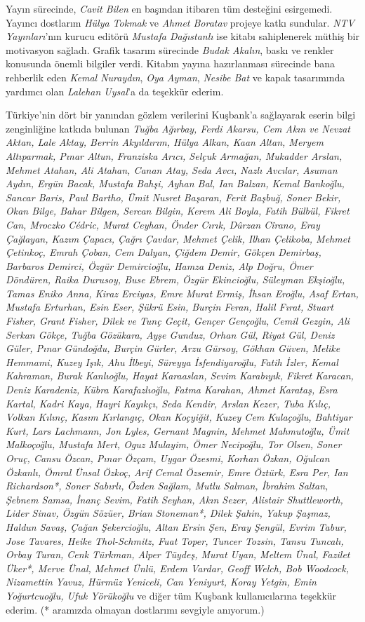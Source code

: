 \documentclass[
  a4paper,
  DIV=11,
  numbers=noendperiod]{scrartcl}
\begin{document}
Yayın sürecinde, \emph{Cavit Bilen} en başından itibaren tüm desteğini
esirgemedi. Yayıncı dostlarım \emph{Hülya Tokmak} ve \emph{Ahmet
Boratav} projeye katkı sundular. \emph{NTV Yayınları}'nın kurucu editörü
\emph{Mustafa Dağıstanlı} ise kitabı sahiplenerek müthiş bir motivasyon
sağladı. Grafik tasarım sürecinde \emph{Budak Akalın}, baskı ve renkler
konusunda önemli bilgiler verdi. Kitabın yayına hazırlanması sürecinde
bana rehberlik eden \emph{Kemal Nuraydın}, \emph{Oya Ayman},
\emph{Nesibe Bat} ve kapak tasarımında yardımcı olan \emph{Lalehan
Uysal}'a da teşekkür ederim.

Türkiye'nin dört bir yanından gözlem verilerini Kuşbank'a sağlayarak
eserin bilgi zenginliğine katkıda bulunan \emph{Tuğba Ağırbay, Ferdi
Akarsu, Cem Akın ve Nevzat Aktan, Lale Aktay, Berrin Akyıldırım, Hülya
Alkan, Kaan Altan, Meryem Altıparmak, Pınar Altun, Franziska Arıcı,
Selçuk Armağan, Mukadder Arslan, Mehmet Atahan, Ali Atahan, Canan Atay,
Seda Avcı, Nazlı Avcılar, Asuman Aydın, Ergün Bacak, Mustafa Bahşi,
Ayhan Bal, Ian Balzan, Kemal Bankoğlu, Sancar Baris, Paul Bartho, Ümit
Nusret Başaran, Ferit Başbuğ, Soner Bekir, Okan Bilge, Bahar Bilgen,
Sercan Bilgin, Kerem Ali Boyla, Fatih Bülbül, Fikret Can, Mroczko
Cédric, Murat Ceyhan, Önder Cırık, Dûrzan Cîrano, Eray Çağlayan, Kazım
Çapacı, Çağrı Çavdar, Mehmet Çelik, Ilhan Çelikoba, Mehmet Çetinkoç,
Emrah Çoban, Cem Dalyan, Çiğdem Demir, Gökçen Demirbaş, Barbaros
Demirci, Özgür Demircioğlu, Hamza Deniz, Alp Doğru, Ömer Döndüren, Raika
Durusoy, Buse Ebrem, Özgür Ekincioğlu, Süleyman Ekşioğlu, Tamas Eniko
Anna, Kiraz Erciyas, Emre Murat Ermiş, İhsan Eroğlu, Asaf Ertan, Mustafa
Erturhan, Esin Eser, Şükrü Esin, Burçin Feran, Halil Fırat, Stuart
Fisher, Grant Fisher, Dilek ve Tunç Geçit, Gençer Gençoğlu, Cemil
Gezgin, Ali Serkan Gökçe, Tuğba Gözükara, Ayşe Gunduz, Orhan Gül, Riyat
Gül, Deniz Güler, Pınar Gündoğdu, Burçin Gürler, Arzu Gürsoy, Gökhan
Güven, Melike Hemmami, Kuzey Işık, Ahu İlbeyi, Süreyya İsfendiyaroğlu,
Fatih İzler, Kemal Kahraman, Burak Kanlıoğlu, Hayat Karaaslan, Sevim
Karabıyık, Fikret Karacan, Deniz Karadeniz, Kübra Karafazlıoğlu, Fatma
Karahan, Ahmet Karataş, Esra Kartal, Kadri Kaya, Hayri Kayıkçı, Seda
Kendir, Arslan Kezer, Tuba Kılıç, Volkan Kılınç, Kasım Kırlangıç, Okan
Koçyiğit, Kuzey Cem Kulaçoğlu, Bahtiyar Kurt, Lars Lachmann, Jon Lyles,
Gernant Magnin, Mehmet Mahmutoğlu, Ümit} \emph{Malkoçoğlu, Mustafa Mert,
Oguz Mulayim, Ömer Necipoğlu, Tor Olsen, Soner Oruç, Cansu Özcan, Pınar
Özçam, Uygar Özesmi, Korhan Özkan, Oğulcan Özkanlı, Ömral Ünsal Özkoç,
Arif Cemal Özsemir, Emre Öztürk, Esra Per, Ian Richardson*, Soner
Sabırlı, Özden Sağlam, Mutlu Salman, İbrahim Saltan, Şebnem Samsa, İnanç
Sevim, Fatih Seyhan, Akın Sezer, Alistair Shuttleworth, Lider Sinav,
Özgün Sözüer, Brian Stoneman*, Dilek Şahin, Yakup Şaşmaz, Haldun Savaş,
Çağan Şekercioğlu, Altan Ersin Şen, Eray Şengül, Evrim Tabur, Jose
Tavares, Heike Thol-Schmitz, Fuat Toper, Tuncer Tozsin, Tansu Tuncalı,
Orbay Turan, Cenk Türkman, Alper Tüydeş, Murat Uyan, Meltem Ünal,
Fazilet Üker*, Merve Ünal, Mehmet Ünlü, Erdem Vardar, Geoff Welch, Bob
Woodcock, Nizamettin} \emph{Yavuz, Hürmüz Yeniceli, Can Yeniyurt, Koray
Yetgin, Emin Yoğurtcuoğlu, Ufuk Yörükoğlu} ve diğer tüm Kuşbank
kullanıcılarına teşekkür ederim. (* aramızda olmayan dostlarımı sevgiyle
anıyorum.)
\end{document}
